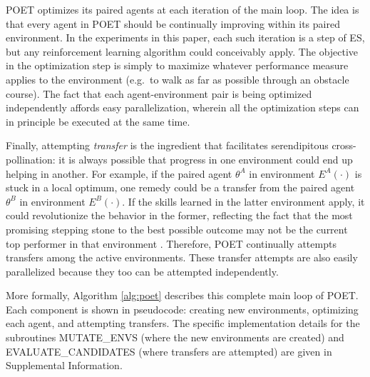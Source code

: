 \documentclass{article}
\newcommand{\jc}[1]{\comments{\textcolor{deepForestGreen}{[JC: #1]}}}
\newcommand{\comments}[1]{#1}
\begin{document}
POET optimizes its paired agents at each iteration of the main loop.   The idea is that every agent in POET should be continually improving within its paired environment.  In the experiments in this paper, each such iteration is a step of ES, but any reinforcement learning algorithm could conceivably apply.  The objective in the optimization step is simply to maximize whatever performance measure applies to the environment (e.g.\ to walk as far as possible through an obstacle course).  The fact that each agent-environment pair is being optimized independently affords easy parallelization, wherein all the optimization steps can in principle be executed at the same time.

Finally, attempting \emph{transfer} is the ingredient that facilitates serendipitous cross-pollination: it is always possible that progress in one environment could end up helping in another.  For example, if the paired agent $\theta^A$ in environment $E^A(\cdot)$ is stuck in a local optimum, one remedy could be a transfer from the paired agent $\theta^B$ in environment $E^B(\cdot)$.  If the skills learned in the latter environment apply, it could revolutionize the behavior in the former, reflecting the fact that the most promising stepping stone to the best possible outcome may not be the current top performer in that environment \cite{stanley:book15, nguyen2016innovative,mouret2015illuminating}.  Therefore, POET continually attempts transfers among the active environments.  These transfer attempts are also easily parallelized because they too can be attempted independently.

More formally, Algorithm \ref{alg:poet} describes this complete main loop of POET. Each component is shown in pseudocode: creating new environments, optimizing each agent, and attempting transfers.  The specific implementation details for the subroutines MUTATE\_ENVS (where the new environments are created) and EVALUATE\_CANDIDATES (where transfers are attempted) are given in Supplemental Information. 

\end{document}
